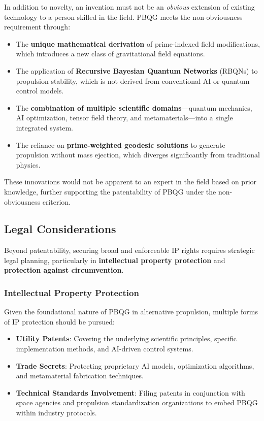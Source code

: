 \documentclass{article}
\theoremstyle{plain}
\begin{document}
In addition to novelty, an invention must not be an \textit{obvious} extension of existing technology to a person skilled in the field. PBQG meets the non-obviousness requirement through:
\begin{itemize}
    \item The \textbf{unique mathematical derivation} of prime-indexed field modifications, which introduces a new class of gravitational field equations.
    \item The application of \textbf{Recursive Bayesian Quantum Networks} (RBQNs) to propulsion stability, which is not derived from conventional AI or quantum control models.
    \item The \textbf{combination of multiple scientific domains}—quantum mechanics, AI optimization, tensor field theory, and metamaterials—into a single integrated system.
    \item The reliance on \textbf{prime-weighted geodesic solutions} to generate propulsion without mass ejection, which diverges significantly from traditional physics.
\end{itemize}

These innovations would not be apparent to an expert in the field based on prior knowledge, further supporting the patentability of PBQG under the non-obviousness criterion.

\subsection{Legal Considerations}
\label{subsec:legal_considerations}

Beyond patentability, securing broad and enforceable IP rights requires strategic legal planning, particularly in \textbf{intellectual property protection} and \textbf{protection against circumvention}.

\subsubsection{Intellectual Property Protection}
\label{subsubsec:IP_protection}

Given the foundational nature of PBQG in alternative propulsion, multiple forms of IP protection should be pursued:
\begin{itemize}
    \item \textbf{Utility Patents}: Covering the underlying scientific principles, specific implementation methods, and AI-driven control systems.
    \item \textbf{Trade Secrets}: Protecting proprietary AI models, optimization algorithms, and metamaterial fabrication techniques.
    \item \textbf{Technical Standards Involvement}: Filing patents in conjunction with space agencies and propulsion standardization organizations to embed PBQG within industry protocols.
\end{itemize}
\end{document}
